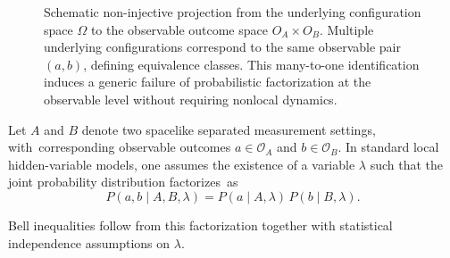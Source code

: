 \documentclass[11pt,a4paper]{article}
\theoremstyle{remark}
\begin{document}
\begin{figure}[H]
      \caption{Schematic non-injective projection from the underlying configuration space
        $\Omega$ to the observable outcome space $O_A \times O_B$.
        Multiple underlying configurations correspond to the same observable pair $(a,b)$,
        defining equivalence classes.
        This many-to-one identification induces a generic failure of probabilistic factorization
        at the observable level without requiring nonlocal dynamics.}
      \label{fig:non-injective-projection}
    \end{figure}

    Let $A$ and $B$ denote two spacelike separated measurement settings, with~corresponding
    observable outcomes $a \in \mathcal{O}_A$ and $b \in \mathcal{O}_B$.
    In standard local hidden-variable models, one assumes the existence of a variable
    $\lambda$ such that the joint probability distribution factorizes~as
\begin{equation}
      P(a,b \mid A,B,\lambda) = P(a \mid A,\lambda)\,P(b \mid B,\lambda).
    \end{equation}

    Bell inequalities follow from this factorization together with statistical independence
    assumptions on $\lambda$.
\end{document}
